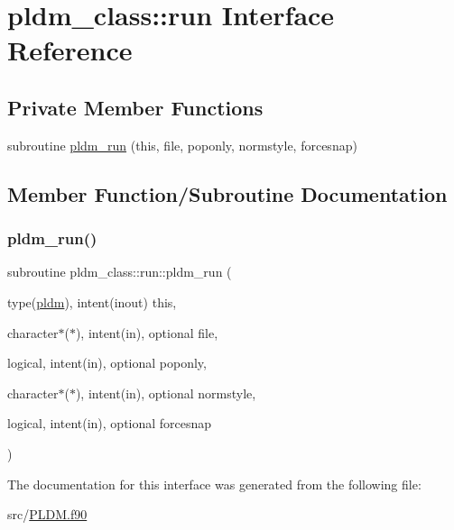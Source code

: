 \hypertarget{interfacepldm__class_1_1run}{}\section{pldm\+\_\+class\+:\+:run Interface Reference}
\label{interfacepldm__class_1_1run}
\subsection*{Private Member Functions}
\begin{DoxyCompactItemize}
\item 
subroutine \hyperlink{interfacepldm__class_1_1run_a10875cb88b1784e67c443796c0599ddf}{pldm\+\_\+run} (this, file, poponly, normstyle, forcesnap)
\end{DoxyCompactItemize}


\subsection{Member Function/\+Subroutine Documentation}
\mbox{\label{interfacepldm__class_1_1run_a10875cb88b1784e67c443796c0599ddf}} 
\subsubsection{\texorpdfstring{pldm\+\_\+run()}{pldm\_run()}}
{\footnotesize\ttfamily subroutine pldm\+\_\+class\+::run\+::pldm\+\_\+run (\begin{DoxyParamCaption}\item[{type(\hyperlink{structpldm__class_1_1pldm}{pldm}), intent(inout)}]{this,  }\item[{character$\ast$($\ast$), intent(in), optional}]{file,  }\item[{logical, intent(in), optional}]{poponly,  }\item[{character$\ast$($\ast$), intent(in), optional}]{normstyle,  }\item[{logical, intent(in), optional}]{forcesnap }\end{DoxyParamCaption})\hspace{0.3cm}{\ttfamily [private]}}



The documentation for this interface was generated from the following file\+:\begin{DoxyCompactItemize}
\item 
src/\hyperlink{_p_l_d_m_8f90}{P\+L\+D\+M.\+f90}\end{DoxyCompactItemize}
